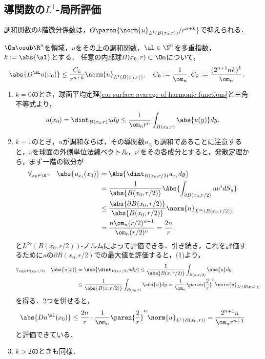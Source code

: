 \documentclass[uplatex,dvipdfmx]{jsreport}
\begin{document}
\subsection{導関数の$L^1$-局所評価}

\begin{tcolorbox}[colframe=ForestGreen, colback=ForestGreen!10!white,breakable,colbacktitle=ForestGreen!40!white,coltitle=black,fonttitle=\bfseries\sffamily,
title=]
    調和関数の$k$階微分係数は，$O\paren{\norm{u}_{L^1(B(x_0,r))}/r^{n+k}}$で抑えられる．
\end{tcolorbox}

\begin{theorem}\label{thm-L1-evaluation-of-derivarive}
    $\Om\osub\R^n$を領域，$u$をその上の調和関数，$\al\in\N^n$を多重指数，$k:=\abs{\al}$とする．
    任意の内部球$B(x_0,r)\subset\Om$について，
    \[\abs{D^\al u(x_0)}\le\frac{C_k}{r^{n+k}}\norm{u}_{L^1(B(x_0,r))},\quad C_0:=\frac{1}{\om_n},C_k:=\frac{(2^{n+1}nk)^k}{\om_n}.\]
\end{theorem}
\begin{Proof}\mbox{}
    \begin{enumerate}
        \item $k=0$のとき，球面平均定理\ref{cor-surface-avarage-of-harmonic-functions}と三角不等式より，
        \[u(x_0)=\dint_{B(x_0,r)}udy\le\frac{1}{\om_nr^n}\int_{B(x_0,r)}\abs{u(y)}dy.\]
        \item $k=1$のとき，$u$が調和ならば，その導関数$u_{x_i}$も調和であることに注意すると，$\nu$を球面の外側単位法線ベクトル，$\nu^i$をその各成分とすると，発散定理から，まず一階の微分が
        \begin{align*}
            \forall_{x_0\in\R^n}\quad\abs{u_{x_i}(x_0)}&=\Abs{\dint_{B(x_0,r/2)}u_{x_i}dy}\\
            &=\frac{1}{\abs{B(x_0,r/2)}}\Abs{\int_{\partial B(x_0,r/2)}u\nu^idS_y}\\
            &\le\frac{\abs{\partial B(x_0,r/2)}}{\abs{B(x_0,r/2)}}\norm{u}_{L^\infty(B(x_0,r/2))}\\
            &=\frac{n\om_n(r/2)^{n-1}}{\om_n(r/2)^n}=\frac{2n}{r}.
        \end{align*}
        と$L^\infty(B(x_0,r/2))$-ノルムによって評価できる．引き続き，これを評価するために$u$の$\partial B(x_0,r/2)$での最大値を評価すると，(1)より，
        \begin{align*}
            \forall_{x\in\partial B(x_0,r/2)}\quad\abs{u(x)}&=\Abs{\dint_{B(x,r/2)}udy}\le\frac{1}{\abs{B(x,r/2)}}\int_{B(x,r/2)}\abs{u}dy\\
            &\le\frac{1}{\abs{B(x,r/2)}}\int_{B(x_0,r)}\abs{u}dy=\frac{1}{\om_n}\paren{\frac{2}{r}}^n\norm{u}_{L^1(B(x_0,r))}.
        \end{align*}
        を得る．2つを併せると，
        \[\abs{Du^\al(x_0)}\le\frac{2n}{r}\cdot\frac{1}{\om_n}\paren{\frac{2}{r}}^n\norm{u}_{L^1(B(x_0,r))}=\frac{2^{n+1}n}{\om_nr^{n+1}}\]
        と評価できている．
        \item $k>2$のときも同様．
    \end{enumerate}
\end{Proof}
\end{document}
